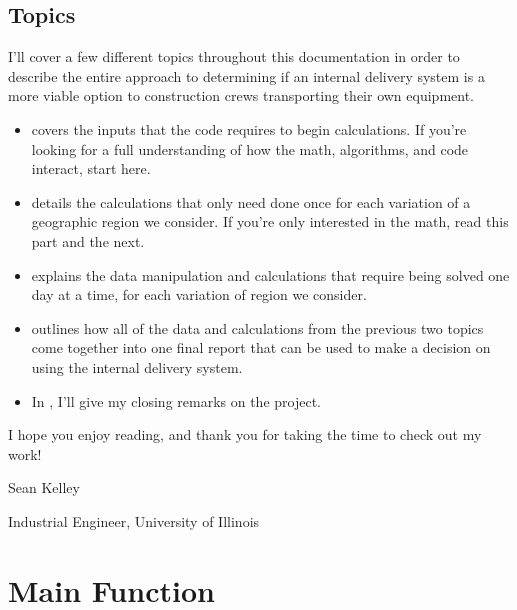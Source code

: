 \documentclass[letterpaper,10pt,english]{sphinxmanual}
\begin{document}
\section{Topics}
\label{\detokenize{introduction:topics}}
I'll cover a few different topics throughout this documentation in order to
describe the entire approach to determining if an internal delivery system is
a more viable option to construction crews transporting their own equipment.
\begin{itemize}
\item {} 
{\hyperref[\detokenize{main:main}]{}} covers the inputs that the code requires to begin
calculations. If you're looking for a full understanding of how the
math, algorithms, and code interact, start here.

\item {} 
{\hyperref[\detokenize{variation:variation}]{}} details the calculations that only need done once
for each variation of a geographic region we consider. If you're only
interested in the math, read this part and the next.

\item {} 
{\hyperref[\detokenize{daily-routing:daily-routing}]{}} explains the data manipulation and calculations
that require being solved one day at a time, for each variation of
region we consider.

\item {} 
{\hyperref[\detokenize{reporting:reporting}]{}} outlines how all of the data and calculations from the
previous two topics come together into one final report that can be
used to make a decision on using the internal delivery system.

\item {} 
In {\hyperref[\detokenize{conclusion:conclusion}]{}}, I'll give my closing remarks on the project.

\end{itemize}

I hope you enjoy reading, and thank you for taking the time to check out my
work!

Sean Kelley

Industrial Engineer, University of Illinois


\chapter{Main Function}
\label{\detokenize{main:main}}\label{\detokenize{main::doc}}\label{\detokenize{main:main-function}}
\end{document}

